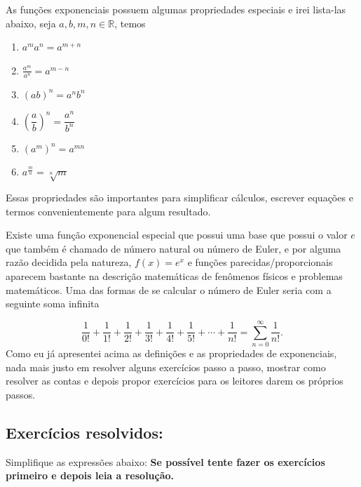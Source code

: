 \documentclass[10pt,a4paper]{article}
\begin{document}
	As funções exponenciais possuem algumas propriedades especiais e irei lista-las abaixo, seja $ a,b,m, n \in \mathbb{R} $, temos
	\begin{enumerate}
		\item $ a^ma^n=a^{m+n} $ \label{1}
		
		\item $ \frac{a^m}{a^n} = a^{m-n} $ \label{2}
		
		\item $ (ab)^n = a^nb^n $ \label{3}
		
		\item $ \left(\dfrac{a}{b}\right)^n = \dfrac{a^n}{b^n} $ \label{4}
		
		\item $ (a^m)^n = a^{mn} $ \label{5}
		
		\item $a^{\frac{m}{n}}= \sqrt[n]{m}$ \label{6}
	\end{enumerate}
	Essas propriedades são importantes para simplificar cálculos, escrever equações e termos convenientemente para algum resultado.
	
	Existe uma função exponencial especial que possui uma base que possui o valor $ e $ que também é chamado de número natural ou número de Euler, e por alguma razão decidida pela natureza, $ f(x) = e^x $ e funções parecidas/proporcionais aparecem bastante na descrição matemáticas de fenômenos físicos e problemas matemáticos.  Uma das formas de se calcular o número de Euler seria com a seguinte soma infinita
	
	\begin{equation}\nonumber
		\dfrac{1}{0!} + \dfrac{1}{1!} + \dfrac{1}{2!} +\dfrac{1}{3!}+ \dfrac{1}{4!}+\dfrac{1}{5!} + \cdots + \dfrac{1}{n!}= \sum_{n=0}^{\infty}\dfrac{1}{n!}.
	\end{equation}
	 Como eu já apresentei acima as definições e as propriedades de exponenciais, nada mais justo em resolver alguns exercícios passo a passo, mostrar como resolver as contas e depois propor exercícios para os leitores darem os próprios passos.
	 
	 \subsection{Exercícios resolvidos:}
	 Simplifique as expressões abaixo: 
	 \textbf{Se possível tente fazer os exercícios primeiro e depois leia a resolução.}
	 
\end{document}
